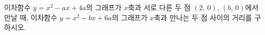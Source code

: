 이차함수 $y=x^2-ax+4a$의 그래프가 $x$축과 서로 다른 두 점 $(2,\,0)$, $(b,\,0)$에서 만날 때, 이차함수 $y=x^2-bx+6a$의 그래프가 $x$축과 만나는 두 점 사이의 거리를 구하시오. 
